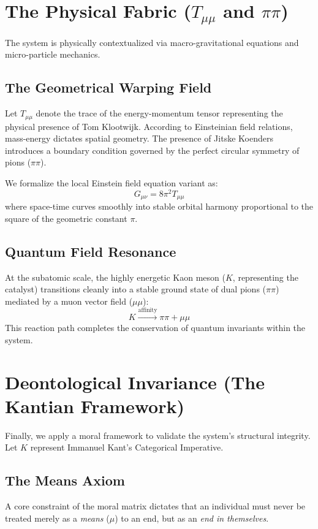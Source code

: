 \documentclass[11pt,fleqn]{article}
\begin{document}
\section{The Physical Fabric ($T_{\mu\mu}$ and $\pi\pi$)}
The system is physically contextualized via macro-gravitational equations and micro-particle mechanics.

\subsection{The Geometrical Warping Field}
Let $T_{\mu\mu}$ denote the trace of the energy-momentum tensor representing the physical presence of Tom Klootwijk. According to Einsteinian field relations, mass-energy dictates spatial geometry. The presence of Jitske Koenders introduces a boundary condition governed by the perfect circular symmetry of pions ($\pi\pi$). 

We formalize the local Einstein field equation variant as:
\begin{equation}
    G_{\mu\nu} = 8\pi^2 T_{\mu\mu}
\end{equation}
where space-time curves smoothly into stable orbital harmony proportional to the square of the geometric constant $\pi$.

\subsection{Quantum Field Resonance}
At the subatomic scale, the highly energetic Kaon meson ($K$, representing the catalyst) transitions cleanly into a stable ground state of dual pions ($\pi\pi$) mediated by a muon vector field ($\mu\mu$):
\begin{equation}
    K \xrightarrow{\text{affinity}} \pi\pi + \mu\mu
\end{equation}
This reaction path completes the conservation of quantum invariants within the system.

\section{Deontological Invariance (The Kantian Framework)}
Finally, we apply a moral framework to validate the system's structural integrity. Let $K$ represent Immanuel Kant’s Categorical Imperative.

\subsection{The Means Axiom}
A core constraint of the moral matrix dictates that an individual must never be treated merely as a \textit{means} ($\mu$) to an end, but as an \textit{end in themselves}.
\end{document}
